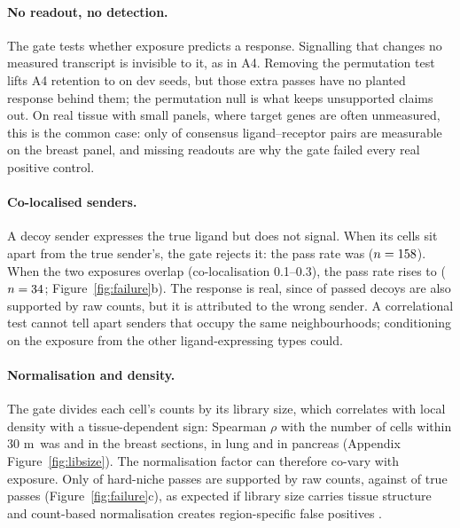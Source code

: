 \documentclass[letterpaper]{article} %
\newcommand{\um}{\ifmmode\,\text{\textmu m}\else\,\textmu m\fi}
\begin{document}
\paragraph{No readout, no detection.} The gate tests whether exposure predicts a response. Signalling that changes no
measured transcript is invisible to it, as in A4. Removing the permutation test lifts A4 retention to
\ablAfourRetNoPerm{} on dev seeds, but those extra passes have no planted response behind them; the permutation null is
what keeps unsupported claims out. On real tissue with small panels, where target genes are often unmeasured, this is
the common case: only \lrBreastRepone{} of \lrConsensus{} consensus ligand--receptor pairs are measurable on the breast
panel, and missing readouts are why the gate failed every real positive control.

\paragraph{Co-localised senders.} A decoy sender expresses the true ligand but does not signal. When its cells sit
apart from the true sender's, the gate rejects it: the pass rate was \decoyPassLow{} ($n=158{}$). When the two
exposures overlap (co-localisation 0.1--0.3), the pass rate rises to \decoyPassMid{} ($n=34{}$;
Figure~\ref{fig:failure}b). The response is real, since \rawSupDecoy{} of passed decoys are also supported by raw
counts, but it is attributed to the wrong sender. A correlational test cannot tell apart senders that occupy the same
neighbourhoods; conditioning on the exposure from the other ligand-expressing types could.

\paragraph{Normalisation and density.} The gate divides each cell's counts by its library size, which correlates with
local density with a tissue-dependent sign: Spearman $\rho$ with the number of cells within 30\um\ was
\libDensBreastRepone{} and \libDensBreastReptwo{} in the breast sections, \libDensLung{} in lung and
\libDensPancreas{} in pancreas (Appendix Figure~\ref{fig:libsize}). The normalisation factor can therefore co-vary
with exposure. Only \rawSupNicheHard{} of hard-niche passes are supported by raw counts, against \rawSupTrue{} of true
passes (Figure~\ref{fig:failure}c), as expected if library size carries tissue structure \cite{bhuva2024} and
count-based normalisation creates region-specific false positives \cite{atta2024}.
\end{document}
